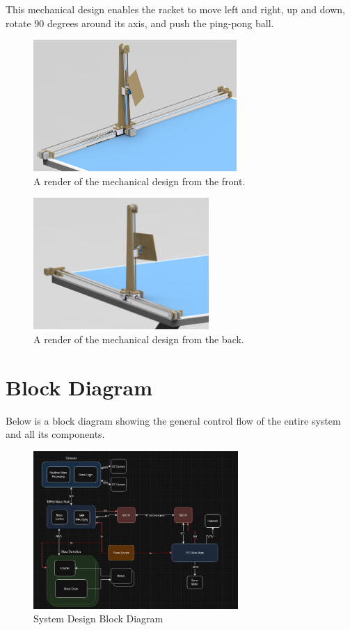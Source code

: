 This mechanical design enables the racket to move left and right, up and down,
rotate 90 degrees around its axis, and push the ping-pong ball.

\begin{figure}[h] 
	\centering \includegraphics[height=5cm]{./images/frontrender.jpg}
	\caption{A render of the mechanical design from the front.}
\end{figure}
\begin{figure}[h] 
	\centering \includegraphics[height=5cm]{./images/backrender.jpg}
	\caption{A render of the mechanical design from the back.}
\end{figure}



\section{Block Diagram}
Below is a block diagram showing the general control flow of the entire system and all its components.

\begin{figure}[h]
	\centering\includegraphics[height=6cm]{./images/blockdiagram}
	\caption{System Design Block Diagram}
\end{figure}

